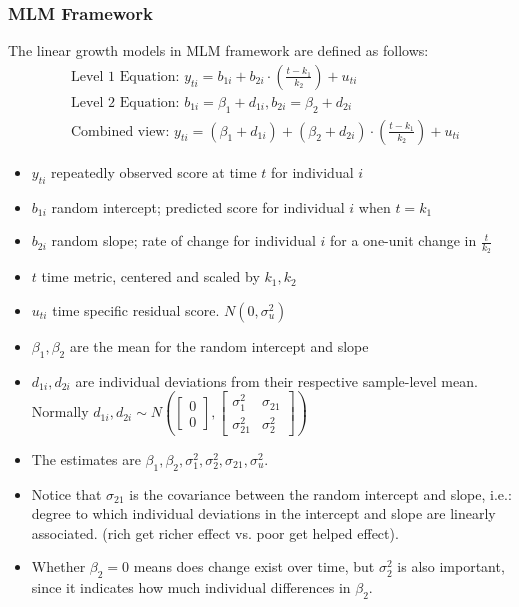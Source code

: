 \subsubsection{MLM Framework} 
The linear growth models in MLM framework are defined as follows: 
    \begin{align*}
        & \text{Level 1 Equation: } y_{ti} = b_{1i} + b_{2i} \cdot \left( \frac{t-k_1}{k_2} \right) + u_{ti} \\
        & \text{Level 2 Equation: } b_{1i} = \beta_1 + d_{1i}, b_{2i} = \beta_2 + d_{2i}\\
        & \text{Combined view: } y_{ti}= (\beta_1 + d_{1i}) + (\beta_2 + d_{2i})  \cdot \left( \frac{t-k_1}{k_2} \right) +  u_{ti}
    \end{align*}
\begin{itemize}
    \item $y_{ti}$ repeatedly observed score at time $t$ for individual $i$ 
    \item $b_{1i}$ random intercept; predicted score for individual $i$ when $t = k_1$
    \item $b_{2i}$ random slope; rate of change for individual $i$ for a one-unit change in $\frac{t}{k_2}$
    \item $t$ time metric, centered and scaled by $k_1, k_2$
    \item $u_{ti}$ time specific residual score. $N(0, \sigma_u^2)$
    \item $\beta_1, \beta_2$ are the mean for the random intercept and slope 
    \item $d_{1i}, d_{2i}$ are individual deviations from their respective sample-level mean. Normally $d_{1i}, d_{2i} \sim N\left(\begin{bmatrix} 0 \\ 0 \end{bmatrix}, \begin{bmatrix} \sigma_1^2 & \sigma_{21} \\ \sigma_{21}^2 & \sigma_2^2 \end{bmatrix} \right) $
    \item The estimates are $\beta_1, \beta_2,  \sigma_1^2, \sigma_2^2, \sigma_{21}, \sigma_u^2$. 
    \item Notice that $\sigma_{21}$ is the covariance between the random intercept and slope, i.e.: degree to which individual deviations in the intercept and slope are linearly associated. (rich get richer effect vs. poor get helped effect). 
    \item Whether $\beta_2 = 0$ means does change exist over time, but $\sigma_2^2$ is also important, since it indicates how much individual differences in $\beta_2$. 
\end{itemize}

